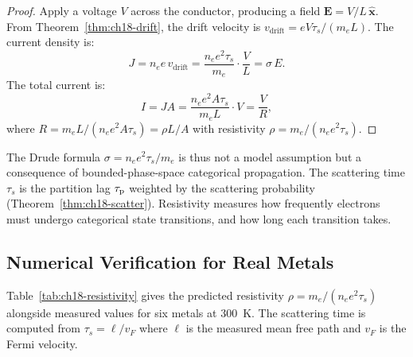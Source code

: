 \begin{proof}
Apply a voltage $V$ across the conductor, producing a field
$\mathbf{E} = V/L\,\hat{\mathbf{x}}$.  From Theorem~\ref{thm:ch18-drift},
the drift velocity is $v_{\mathrm{drift}} = eV\tau_s/(m_e L)$.  The current
density is:
\begin{equation}
  J = n_e e\,v_{\mathrm{drift}} = \frac{n_e e^2 \tau_s}{m_e}\cdot
    \frac{V}{L} = \sigma\, E.
\end{equation}
The total current is:
\begin{equation}
  I = JA = \frac{n_e e^2 A\tau_s}{m_e L}\cdot V = \frac{V}{R},
\end{equation}
where $R = m_e L/(n_e e^2 A\tau_s) = \rho L/A$ with resistivity
$\rho = m_e/(n_e e^2 \tau_s)$.
\end{proof}

\begin{remark}
  The Drude formula $\sigma = n_e e^2\tau_s/m_e$ is thus not a model
  assumption but a consequence of bounded-phase-space categorical
  propagation.  The scattering time $\tau_s$ is the partition lag
  $\tau_{\mathrm{p}}$ weighted by the scattering probability
  (Theorem~\ref{thm:ch18-scatter}).  Resistivity measures how
  frequently electrons must undergo categorical state transitions, and
  how long each transition takes.
\end{remark}

\subsection{Numerical Verification for Real Metals}

Table~\ref{tab:ch18-resistivity} gives the predicted resistivity
$\rho = m_e/(n_e e^2\tau_s)$ alongside measured values for six metals at
300~K.  The scattering time is computed from $\tau_s = \ell/v_F$ where
$\ell$ is the measured mean free path and $v_F$ is the Fermi velocity.

